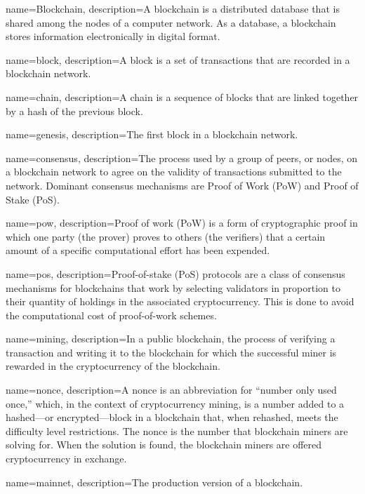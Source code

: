  {
	name=Blockchain,
	description={A blockchain is a distributed database that is shared among the nodes of a computer network. As a database, a blockchain stores information electronically in digital format.}
}

 {
	name=block,
	description={A block is a set of transactions that are recorded in a blockchain network.}
}

 {
	name=chain,
	description={A chain is a sequence of blocks that are linked together by a hash of the previous block.}
}

 {
	name=genesis,
	description={The first block in a blockchain network.}
}

 {
	name=consensus,
	description={The process used by a group of peers, or nodes, on a blockchain network to agree on the validity of transactions submitted to the network. Dominant consensus mechanisms are Proof of Work (PoW) and Proof of Stake (PoS).}
}

 {
	name=pow,
	description={Proof of work (PoW) is a form of cryptographic proof in which one party (the prover) proves to others (the verifiers) that a certain amount of a specific computational effort has been expended.}
}

 {
	name=pos,
	description={Proof-of-stake (PoS) protocols are a class of consensus mechanisms for blockchains that work by selecting validators in proportion to their quantity of holdings in the associated cryptocurrency. This is done to avoid the computational cost of proof-of-work schemes.}
}

 {
	name=mining,
	description={In a public blockchain, the process of verifying a transaction and writing it to the blockchain for which the successful miner is rewarded in the cryptocurrency of the blockchain.}
}

 {
	name=nonce,
	description={A nonce is an abbreviation for ``number only used once,'' which, in the context of cryptocurrency mining, is a number added to a hashed—or encrypted—block in a blockchain that, when rehashed, meets the difficulty level restrictions. The nonce is the number that blockchain miners are solving for. When the solution is found, the blockchain miners are offered cryptocurrency in exchange.}
}

 {
	name=mainnet,
	description={The production version of a blockchain.}
}

